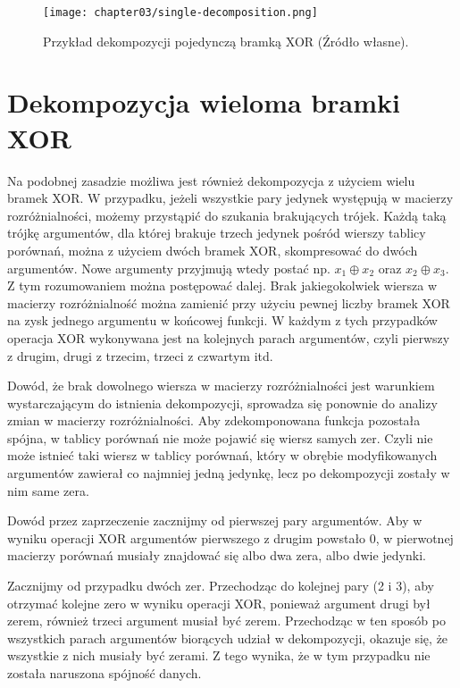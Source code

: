 \begin{figure}[H]
\centering
\texttt{[image: chapter03/single-decomposition.png]}
\caption{Przykład dekompozycji pojedynczą bramką XOR (Źródło własne).}
\end{figure}

\section{Dekompozycja wieloma bramki XOR}

Na podobnej zasadzie możliwa jest również dekompozycja z użyciem wielu bramek XOR.
W przypadku,
jeżeli wszystkie pary jedynek występują w macierzy rozróżnialności,
możemy przystąpić do szukania brakujących trójek.
Każdą taką trójkę argumentów,
dla której brakuje trzech jedynek pośród wierszy tablicy porównań,
można z użyciem dwóch bramek XOR,
skompresować do dwóch argumentów.
Nowe argumenty przyjmują wtedy postać np. $x_1 \oplus x_2$ oraz $x_2 \oplus x_3$.
Z tym rozumowaniem można postępować dalej.
Brak jakiegokolwiek wiersza w macierzy rozróżnialność można zamienić przy użyciu pewnej liczby bramek XOR na zysk jednego argumentu w końcowej funkcji.
W każdym z tych przypadków operacja XOR wykonywana jest na kolejnych parach argumentów,
czyli pierwszy z drugim,
drugi z trzecim,
trzeci z czwartym itd.

Dowód,
że brak dowolnego wiersza w macierzy rozróżnialności jest warunkiem wystarczającym do istnienia dekompozycji,
sprowadza się ponownie do analizy zmian w macierzy rozróżnialności.
Aby zdekomponowana funkcja pozostała spójna,
w tablicy porównań nie może pojawić się wiersz samych zer.
Czyli nie może istnieć taki wiersz w tablicy porównań,
który w obrębie modyfikowanych argumentów zawierał co najmniej jedną jedynkę,
lecz po dekompozycji zostały w nim same zera.

Dowód przez zaprzeczenie zacznijmy od pierwszej pary argumentów.
Aby w wyniku operacji XOR argumentów pierwszego z drugim powstało 0,
w pierwotnej macierzy porównań musiały znajdować się albo dwa zera,
albo dwie jedynki.

Zacznijmy od przypadku dwóch zer.
Przechodząc do kolejnej pary (2 i 3),
aby otrzymać kolejne zero w wyniku operacji XOR,
ponieważ argument drugi był zerem,
również trzeci argument musiał być zerem.
Przechodząc w ten sposób po wszystkich parach argumentów biorących udział w dekompozycji,
okazuje się,
że wszystkie z nich musiały być zerami.
Z tego wynika,
że w tym przypadku nie została naruszona spójność danych.

